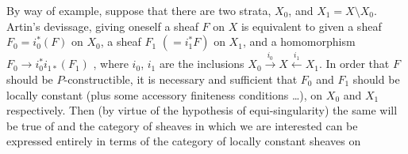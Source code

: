 \documentclass[11pt,a4paper]{article}
\begin{document}
By way of example, suppose that there are  two  strata,  $X_0$, and $X_1 = X \setminus X_0$.   Artin's devissage, giving oneself a sheaf $F$ on $X$ is equivalent to  given a sheaf $F_0 = i_0^*(F)$ on $X_0$, a sheaf $F_1$ $(= i_1^*F)$ on $X_1$, and a homomorphism $F_0 \to i_0^*i_{1*}(F_1)$ , where $i_0$, $i_1$ are the inclusions $X_0 \xrightarrow{i_0} X \xleftarrow{i_1} X_1$. In order that $F$ should be $P$-constructible, it is necessary and sufficient that $F_0$ and $F_1$ should be locally constant (plus some accessory finiteness conditions …), on $X_0$ and $X_1$ respectively. Then (by virtue of the hypothesis of equi-singularity) the same will be true of \struck{\ill{}}  and the category of sheaves in which we are interested can be expressed entirely in terms of the category of locally constant sheaves on
\end{document}
